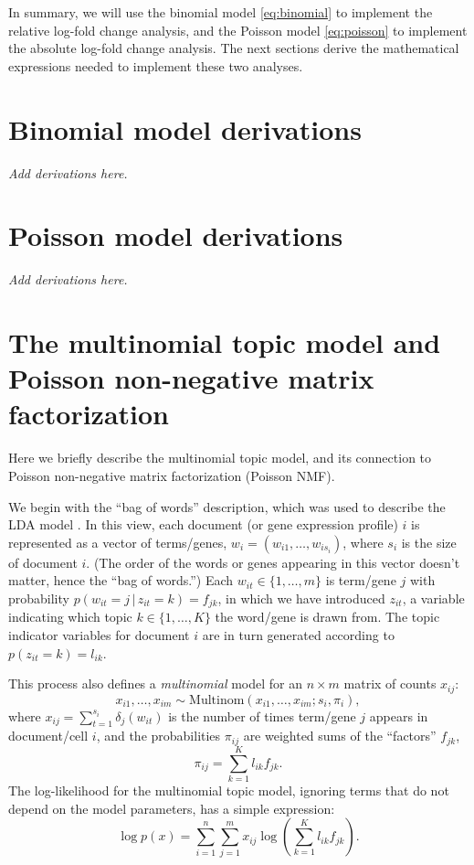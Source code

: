 \documentclass[final]{siamart171218}
\begin{document}
In summary, we will use the binomial model \eqref{eq:binomial} to
implement the relative log-fold change analysis, and the Poisson model
\eqref{eq:poisson} to implement the absolute log-fold change
analysis. The next sections derive the mathematical expressions
needed to implement these two analyses.

\section{Binomial model derivations}

{\em Add derivations here.}

\section{Poisson model derivations}

{\em Add derivations here.}

\section{The multinomial topic model and Poisson non-negative matrix
  factorization}

Here we briefly describe the multinomial topic model, and its
connection to Poisson non-negative matrix factorization (Poisson NMF).

We begin with the ``bag of words'' description, which was used to
describe the LDA model \cite{blei-2003}. In this view, each document
(or gene expression profile) $i$ is represented as a vector of
terms/genes, $w_i = (w_{i1}, \ldots, w_{is_i})$, where $s_i$ is the
size of document $i$. (The order of the words or genes appearing in
this vector doesn't matter, hence the ``bag of words.'') Each $w_{it}
\in \{1, \ldots, m\}$ is term/gene $j$ with probability
$p(w_{it} = j \,|\, z_{it} = k) = f_{jk}$, in which we have introduced
$z_{it}$, a variable indicating which topic $k \in \{1, \ldots, K\}$
the word/gene is drawn from. The topic indicator variables for
document $i$ are in turn generated according to $p(z_{it} = k) =
l_{ik}$.

This process also defines a {\em multinomial} model for an $n \times
m$ matrix of counts $x_{ij}$:
\begin{equation}
x_{i1}, \ldots, x_{im} \sim
\mathrm{Multinom}(x_{i1}, \ldots, x_{im}; s_i, \pi_i),
\end{equation}
where $x_{ij} = \sum_{t=1}^{s_i} \delta_j(w_{it})$ is the number of
times term/gene $j$ appears in document/cell $i$, and the
probabilities $\pi_{ij}$ are weighted sums of the ``factors''
$f_{jk}$,
\begin{equation}
\pi_{ij} = \sum_{k=1}^K l_{ik} f_{jk}.
\end{equation}
The log-likelihood for the multinomial topic model, ignoring terms
that do not depend on the model parameters, has a simple expression:
\begin{equation}
\log p(x) = \sum_{i=1}^n \sum_{j=1}^m
x_{ij} \log({\textstyle \sum_{k=1}^K l_{ik} f_{jk}}).
\end{equation}
\end{document}
